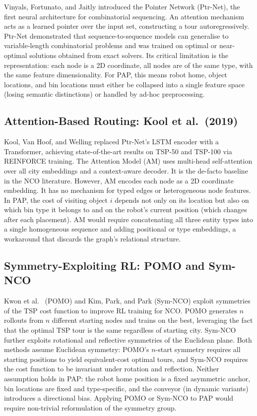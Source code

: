 \documentclass[conference]{IEEEtran}
\begin{document}
Vinyals, Fortunato, and Jaitly \cite{vinyals2015pointer} introduced the Pointer Network (Ptr-Net), the first neural architecture for combinatorial sequencing. An attention mechanism acts as a learned pointer over the input set, constructing a tour autoregressively. Ptr-Net demonstrated that sequence-to-sequence models can generalise to variable-length combinatorial problems and was trained on optimal or near-optimal solutions obtained from exact solvers. Its critical limitation is the representation: each node is a 2D coordinate, all nodes are of the same type, with the same feature dimensionality. For PAP, this means robot home, object locations, and bin locations must either be collapsed into a single feature space (losing semantic distinctions) or handled by ad-hoc preprocessing.

\subsection{Attention-Based Routing: Kool et al.\ (2019)}

Kool, Van Hoof, and Welling \cite{kool2019attention} replaced Ptr-Net's LSTM encoder with a Transformer, achieving state-of-the-art results on TSP-50 and TSP-100 via REINFORCE training. The Attention Model (AM) uses multi-head self-attention over all city embeddings and a context-aware decoder. It is the de-facto baseline in the NCO literature. However, AM encodes each node as a 2D coordinate embedding. It has no mechanism for typed edges or heterogeneous node features. In PAP, the cost of visiting object $i$ depends not only on its location but also on which bin type it belongs to and on the robot's current position (which changes after each placement). AM would require concatenating all three entity types into a single homogeneous sequence and adding positional or type embeddings, a workaround that discards the graph's relational structure.

\subsection{Symmetry-Exploiting RL: POMO and Sym-NCO}

Kwon et al.\ \cite{kwon2020pomo} (POMO) and Kim, Park, and Park \cite{kim2022symnco} (Sym-NCO) exploit symmetries of the TSP cost function to improve RL training for NCO. POMO generates $n$ rollouts from $n$ different starting nodes and trains on the best, leveraging the fact that the optimal TSP tour is the same regardless of starting city. Sym-NCO further exploits rotational and reflective symmetries of the Euclidean plane. Both methods assume Euclidean symmetry: POMO's $n$-start symmetry requires all starting positions to yield equivalent-cost optimal tours, and Sym-NCO requires the cost function to be invariant under rotation and reflection. Neither assumption holds in PAP: the robot home position is a fixed asymmetric anchor, bin locations are fixed and type-specific, and the conveyor (in dynamic variants) introduces a directional bias. Applying POMO or Sym-NCO to PAP would require non-trivial reformulation of the symmetry group.
\end{document}
